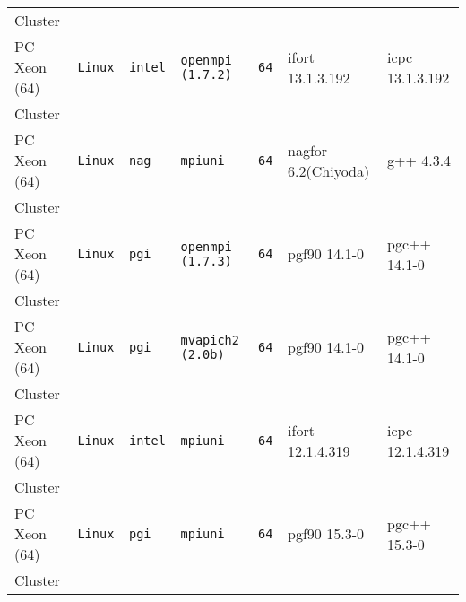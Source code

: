 \begin{longtable}{lllllll}
Cluster               &           &                 &                     &                 &                                     &                                   \\
PC Xeon (64)          &\tt Linux  &\tt intel        &\tt openmpi (1.7.2)  &\tt 64           & ifort \footnotesize 13.1.3.192      & icpc \footnotesize 13.1.3.192     \\
Cluster               &           &                 &                     &                 &                                     &                                   \\
PC Xeon (64)          &\tt Linux  &\tt nag          &\tt mpiuni           &\tt 64           & nagfor \footnotesize 6.2(Chiyoda)   & g++  \footnotesize 4.3.4          \\
Cluster               &           &                 &                     &                 &                                     &                                   \\
PC Xeon (64)          &\tt Linux  &\tt pgi          &\tt openmpi (1.7.3)  &\tt 64           & pgf90 \footnotesize 14.1-0          & pgc++ \footnotesize 14.1-0        \\
Cluster               &           &                 &                     &                 &                                     &                                   \\
PC Xeon (64)          &\tt Linux  &\tt pgi          &\tt mvapich2 (2.0b)  &\tt 64           & pgf90 \footnotesize 14.1-0          & pgc++ \footnotesize 14.1-0        \\
Cluster               &           &                 &                     &                 &                                     &                                   \\
PC Xeon (64)          &\tt Linux  &\tt intel        &\tt mpiuni           &\tt 64           & ifort \footnotesize 12.1.4.319      & icpc \footnotesize 12.1.4.319     \\
Cluster               &           &                 &                     &                 &                                     &                                   \\
PC Xeon (64)          &\tt Linux  &\tt pgi          &\tt mpiuni           &\tt 64           & pgf90 \footnotesize 15.3-0          & pgc++ \footnotesize 15.3-0        \\
Cluster               &           &                 &                     &                 &                                     &                                   \\

\end{longtable}
